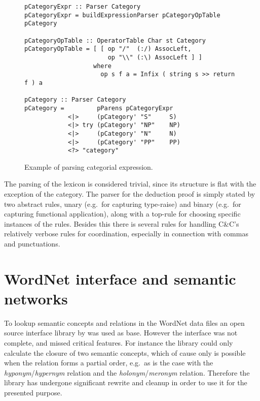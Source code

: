 \begin{figure}[ht]
\begin{cframed}{.9\textwidth}
\begin{lstlisting}[language=GHC]
pCategoryExpr :: Parser Category
pCategoryExpr = buildExpressionParser pCategoryOpTable pCategory

pCategoryOpTable :: OperatorTable Char st Category
pCategoryOpTable = [ [ op "/"  (:/) AssocLeft, 
                       op "\\" (:\) AssocLeft ] ]
                   where 
                     op s f a = Infix ( string s >> return f ) a

pCategory :: Parser Category
pCategory =         pParens pCategoryExpr
            <|>     (pCategory' "S"     S)
            <|> try (pCategory' "NP"    NP)
            <|>     (pCategory' "N"     N)
            <|>     (pCategory' "PP"    PP)
            <?> "category" 
\end{lstlisting}	
\end{cframed}
\caption{Example of parsing categorial expression.}
\label{fig:categoryExpression}
\end{figure}

The parsing of the lexicon is considered trivial, since its structure is flat with the exception of the category. The parser for the deduction proof is simply stated by two abstract rules, unary (e.g.\ for capturing type-raise) and binary (e.g.\ for capturing functional application), along with a top-rule for choosing specific instances of the rules. Besides this there is several rules for handling C\&C's relatively verbose rules for coordination, especially in connection with commas and punctuations.


\section{WordNet interface and semantic networks}
To lookup semantic concepts and relations in the WordNet data files an open source interface library by \citeauthor{hwordnet}  was used as base. However the interface was not complete, and missed critical features. For instance the library could only calculate the closure of two semantic concepts, which of cause only is possible when the relation forms a partial order, e.g.\ as is the case with the \emph{hyponym}/\emph{hypernym} relation and the \emph{holonym}/\emph{meronym} relation. Therefore the library has undergone significant rewrite and cleanup in order to use it for the presented purpose.

